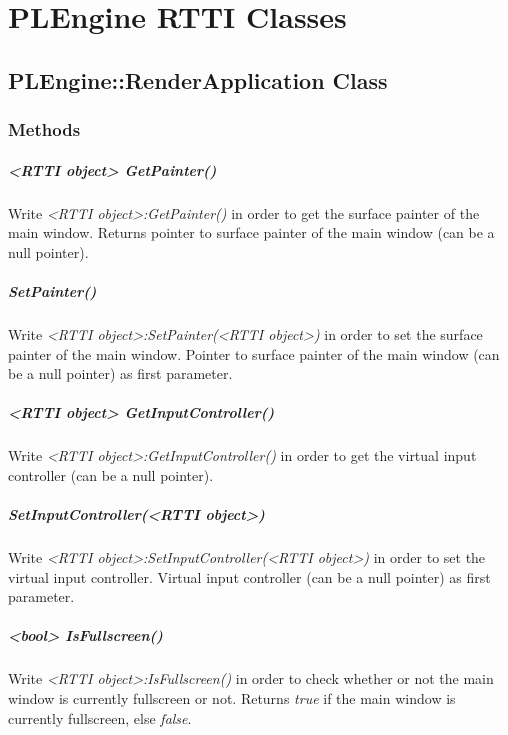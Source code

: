 \chapter{PLEngine RTTI Classes}




\section{PLEngine::RenderApplication Class}


\subsection{Methods}

\paragraph{<RTTI object> GetPainter()}
Write \emph{<RTTI object>:GetPainter()} in order to get the surface painter of the main window. Returns pointer to surface painter of the main window (can be a null pointer).

\paragraph{SetPainter()}
Write \emph{<RTTI object>:SetPainter(<RTTI object>)} in order to set the surface painter of the main window. Pointer to surface painter of the main window (can be a null pointer) as first parameter.

\paragraph{<RTTI object> GetInputController()}
Write \emph{<RTTI object>:GetInputController()} in order to get the virtual input controller (can be a null pointer).

\paragraph{SetInputController(<RTTI object>)}
Write \emph{<RTTI object>:SetInputController(<RTTI object>)} in order to set the virtual input controller. Virtual input controller (can be a null pointer) as first parameter.

\paragraph{<bool> IsFullscreen()}
Write \emph{<RTTI object>:IsFullscreen()} in order to check whether or not the main window is currently fullscreen or not. Returns \emph{true} if the main window is currently fullscreen, else \emph{false}.

